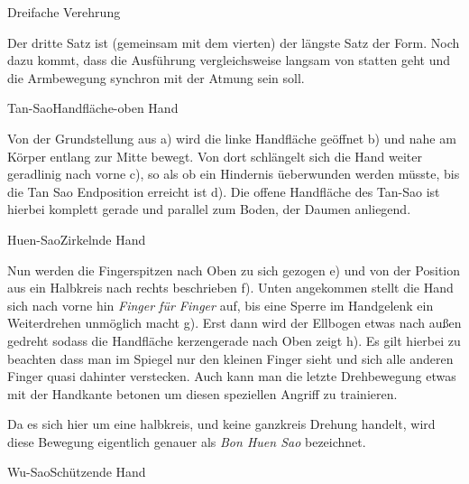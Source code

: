 \begin{WTSatz}{Dreifache Verehrung}%
	
	
	Der dritte Satz ist (gemeinsam mit dem vierten) der l\"angste Satz der Form. Noch dazu kommt, dass die Ausf\"uhrung vergleichsweise langsam von statten geht und die Armbewegung synchron mit der Atmung sein soll.
	
	\begin{WTSatzTeil}{Tan-Sao}{Handfl\"ache-oben Hand}
		
		Von der Grundstellung aus a) wird die linke Handfl\"ache ge\"offnet b) und nahe am K\"orper entlang zur Mitte bewegt. Von dort schl\"angelt sich die Hand weiter geradlinig nach vorne c), so als ob ein Hindernis \"ueberwunden werden m\"usste, bis die Tan Sao Endposition erreicht ist d). Die offene Handfl\"ache des Tan-Sao ist hierbei komplett gerade und parallel zum Boden, der Daumen anliegend.
		
	\end{WTSatzTeil}
	\begin{WTSatzTeil}{Huen-Sao}{Zirkelnde Hand}
		
		Nun werden die Fingerspitzen nach Oben zu sich gezogen e) und von der Position aus ein Halbkreis nach rechts beschrieben f). Unten angekommen stellt die Hand sich nach vorne hin \textit{Finger f\"ur Finger} auf, bis eine Sperre im Handgelenk ein Weiterdrehen unm\"oglich macht g). Erst dann wird der Ellbogen etwas nach au{\ss}en gedreht sodass die Handfl\"ache kerzengerade nach Oben zeigt h). Es gilt hierbei zu beachten dass man im Spiegel nur den kleinen Finger sieht und sich alle anderen Finger quasi dahinter verstecken. Auch kann man die letzte Drehbewegung etwas mit der Handkante betonen um diesen speziellen Angriff zu trainieren.
		
		\begin{WTCommonBegriff}
			Da es sich hier um eine halbkreis, und keine ganzkreis Drehung handelt, wird diese Bewegung eigentlich genauer als \textit{Bon Huen Sao} bezeichnet.
		\end{WTCommonBegriff}

	\end{WTSatzTeil}
	\begin{WTSatzTeil}{Wu-Sao}{Sch\"utzende Hand}
		

\end{WTSatzTeil}
\end{WTSatz}
